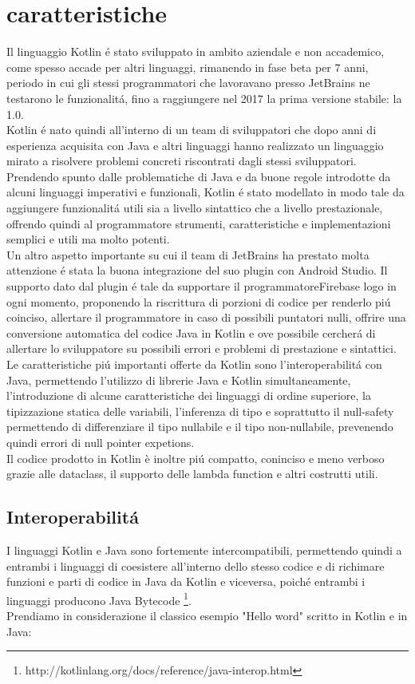 \section{caratteristiche}
Il linguaggio Kotlin \'e stato sviluppato in ambito aziendale e non accademico, come spesso accade per altri linguaggi, rimanendo in fase beta  per 7 anni, periodo in cui gli stessi programmatori che lavoravano presso JetBrains ne testarono le funzionalit\'a, fino a raggiungere nel 2017 la prima versione stabile: la 1.0. \\
Kotlin \'e nato quindi all'interno di un team di sviluppatori che dopo anni di esperienza acquisita con Java e altri linguaggi hanno realizzato un linguaggio mirato a risolvere problemi concreti riscontrati dagli stessi sviluppatori.\\
Prendendo spunto dalle problematiche di Java e da buone regole introdotte da alcuni linguaggi imperativi e funzionali, Kotlin \'e stato modellato in modo tale da aggiungere funzionalit\'a utili sia a livello sintattico che a livello prestazionale, offrendo quindi al programmatore strumenti, caratteristiche e implementazioni semplici e utili ma molto potenti.\\
Un altro aspetto importante su cui il team di JetBrains ha prestato molta attenzione \'e stata la buona integrazione del suo plugin con Android Studio. Il supporto dato dal plugin \'e tale da supportare il programmatoreFirebase logo in ogni momento, proponendo la riscrittura di porzioni di codice per renderlo pi\'u coinciso, allertare il programmatore in caso di possibili puntatori nulli, offrire una conversione automatica del codice Java in Kotlin e ove possibile cercher\'a di allertare lo sviluppatore su possibili errori e problemi di prestazione e sintattici.\\
Le caratteristiche pi\'u importanti offerte da Kotlin sono l'interoperabilit\'a con Java, permettendo l'utilizzo di librerie Java e Kotlin simultaneamente, l'introduzione di alcune caratteristiche dei linguaggi di ordine superiore, la tipizzazione statica delle variabili, l'inferenza di tipo e soprattutto il null-safety permettendo di differenziare il tipo nullabile e il tipo non-nullabile, prevenendo quindi errori di null pointer expetions.\\
Il codice prodotto in Kotlin \`e inoltre pi\'u compatto, coninciso e meno verboso grazie alle dataclass, il supporto delle lambda function e altri costrutti utili.


\subsection{Interoperabilit\'a}
I linguaggi Kotlin e Java sono fortemente intercompatibili, permettendo quindi a entrambi i linguaggi di coesistere all'interno dello stesso codice e di richimare funzioni e parti di codice in Java da Kotlin e viceversa, poich\'e entrambi i linguaggi producono Java Bytecode  \footnote{http://kotlinlang.org/docs/reference/java-interop.html}.\\
Prendiamo in considerazione il classico esempio "Hello word" scritto in Kotlin e in Java:

